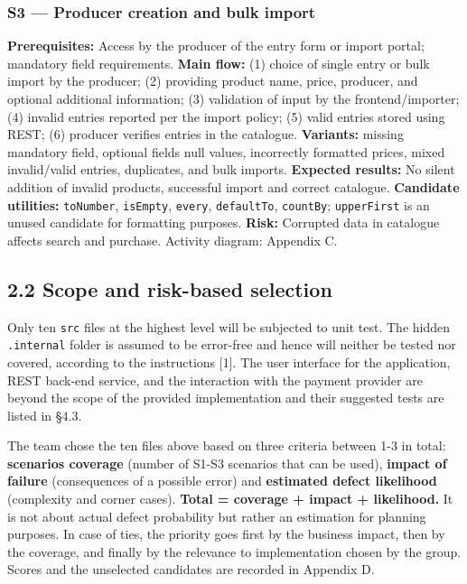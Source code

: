\documentclass[
  9pt,
]{article}
\begin{document}
\subsubsection{S3 --- Producer creation and bulk
import}\label{s3-producer-creation-and-bulk-import}

\textbf{Prerequisites:} Access by the producer of the entry form or
import portal; mandatory field requirements. \textbf{Main flow:} (1)
choice of single entry or bulk import by the producer; (2) providing
product name, price, producer, and optional additional information; (3)
validation of input by the frontend/importer; (4) invalid entries
reported per the import policy; (5) valid entries stored using REST; (6)
producer verifies entries in the catalogue. \textbf{Variants:} missing
mandatory field, optional fields null values, incorrectly formatted
prices, mixed invalid/valid entries, duplicates, and bulk imports.
\textbf{Expected results:} No silent addition of invalid products,
successful import and correct catalogue. \textbf{Candidate utilities:}
\texttt{toNumber}, \texttt{isEmpty}, \texttt{every}, \texttt{defaultTo},
\texttt{countBy}; \texttt{upperFirst} is an unused candidate for
formatting purposes. \textbf{Risk:} Corrupted data in catalogue affects
search and purchase. Activity diagram: Appendix C.

\subsection{2.2 Scope and risk-based
selection}\label{scope-and-risk-based-selection}

Only ten \texttt{src} files at the highest level will be subjected to
unit test. The hidden \texttt{.internal} folder is assumed to be
error-free and hence will neither be tested nor covered, according to
the instructions {[}1{]}. The user interface for the application, REST
back-end service, and the interaction with the payment provider are
beyond the scope of the provided implementation and their suggested
tests are listed in §4.3.

The team chose the ten files above based on three criteria between 1-3
in total: \textbf{scenarios coverage} (number of S1-S3 scenarios that
can be used), \textbf{impact of failure} (consequences of a possible
error) and \textbf{estimated defect likelihood} (complexity and corner
cases). \textbf{Total = coverage + impact + likelihood.} It is not about
actual defect probability but rather an estimation for planning
purposes. In case of ties, the priority goes first by the business
impact, then by the coverage, and finally by the relevance to
implementation chosen by the group. Scores and the unselected candidates
are recorded in Appendix D.
\end{document}
